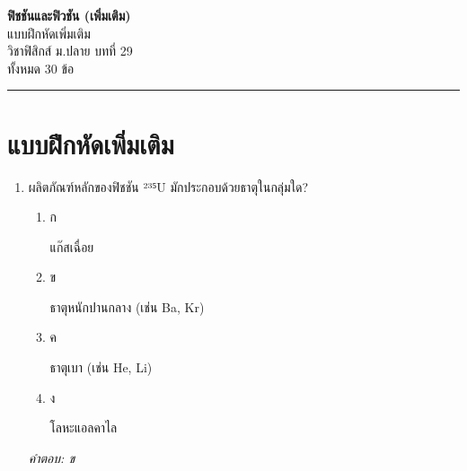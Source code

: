 \documentclass[12pt]{article}
\begin{document}
\begin{center}
{\Large\textbf{ฟิชชันและฟิวชัน (เพิ่มเติม)}}\\[6pt]
{\normalsize แบบฝึกหัดเพิ่มเติม}\\[6pt]
{\normalsize วิชาฟิสิกส์ ม.ปลาย บทที่ 29}\\[4pt]
{\footnotesize ทั้งหมด 30 ข้อ}
\end{center}
\hrule
\bigskip

\section*{แบบฝึกหัดเพิ่มเติม}
\begin{enumerate}[label=\arabic*., itemsep=0.5\baselineskip, topsep=0.5\baselineskip, leftmargin=*]
\item ผลิตภัณฑ์หลักของฟิชชัน ²³⁵U มักประกอบด้วยธาตุในกลุ่มใด?
\begin{enumerate}[label=\alph*)., itemsep=0.3\baselineskip, topsep=0.3\baselineskip]
\item ก\ 
\begin{minipage}[t]{0.9\linewidth}
\raggedright แก๊สเฉื่อย
\end{minipage}
\item ข\ 
\begin{minipage}[t]{0.9\linewidth}
\raggedright ธาตุหนักปานกลาง (เช่น Ba, Kr)
\end{minipage}
\item ค\ 
\begin{minipage}[t]{0.9\linewidth}
\raggedright ธาตุเบา (เช่น He, Li)
\end{minipage}
\item ง\ 
\begin{minipage}[t]{0.9\linewidth}
\raggedright โลหะแอลคาไล
\end{minipage}
\end{enumerate}
\vspace{-0.3\baselineskip}
\begin{small}
\textit{คำตอบ: ข}
\end{small}


\end{enumerate}
\end{document}
